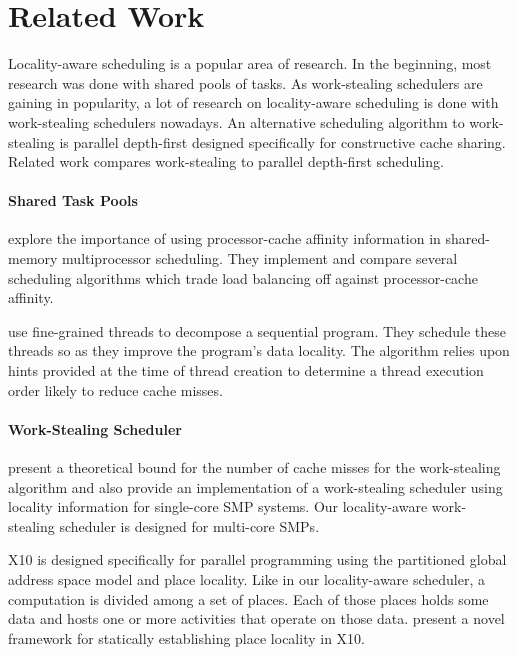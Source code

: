 
\chapter{Related Work}
\label{chap:locality-related-work}

Locality-aware scheduling is a popular area of research. In the
beginning, most research was done with shared pools of tasks. As
work-stealing schedulers are gaining in popularity, a lot of research
on locality-aware scheduling is done with work-stealing schedulers
nowadays. An alternative scheduling algorithm to work-stealing is
parallel depth-first designed specifically for constructive cache
sharing. Related work compares work-stealing to parallel depth-first
scheduling.

\subsubsection{Shared Task Pools}

\textcite{Squillante1993} explore the importance of using
processor-cache affinity information in shared-memory multiprocessor
scheduling. They implement and compare several scheduling algorithms
which trade load balancing off against processor-cache affinity.

\textcite{Philbin1996} use fine-grained threads to decompose a
sequential program. They schedule these threads so as they improve the
program's data locality. The algorithm relies upon hints provided at
the time of thread creation to determine a thread execution order
likely to reduce cache misses.

\subsubsection{Work-Stealing Scheduler}

\textcite{Acar2000} present a theoretical bound for the number of
cache misses for the work-stealing algorithm and also provide an
implementation of a work-stealing scheduler using locality information
for single-core SMP systems. Our locality-aware work-stealing
scheduler is designed for multi-core SMPs.

X10 \cite{Charles2005, Saraswat2010} is designed specifically for
parallel programming using the partitioned global address space model
and place locality. Like in our locality-aware scheduler, a
computation is divided among a set of places. Each of those places
holds some data and hosts one or more activities that operate on those
data. \textcite{Agarwal2008} present a novel framework for statically
establishing place locality in X10.

